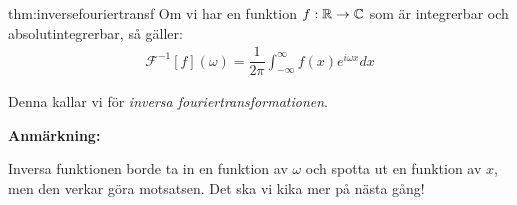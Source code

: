 \par\bigskip
\begin{theo}{thm:inversefouriertransf}
  Om vi har en funktion $f:\mathbb{R}\to\mathbb{C}$ som är integrerbar och absolutintegrerbar, så gäller:
  \begin{equation*}
    \begin{gathered}
      \mathcal{F}^{-1}[f](\omega) = \dfrac{1}{2\pi}\int_{-\infty}^{\infty}f(x)e^{i\omega x}dx
    \end{gathered}
  \end{equation*}
  \par\bigskip
  \noindent Denna kallar vi för \textit{inversa fouriertransformationen}.
\end{theo}
\par\bigskip
\noindent\textbf{Anmärkning:}\par
\noindent Inversa funktionen borde ta in en funktion av $\omega$ och spotta ut en funktion av $x$, men den verkar göra motsatsen. Det ska vi kika mer på nästa gång!
